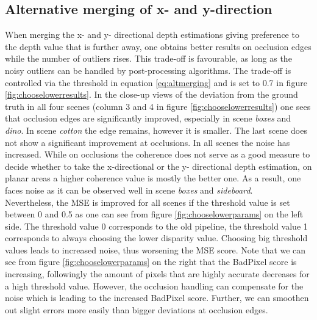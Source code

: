 \documentclass  [
  paper    = a4,
  BCOR     = 10mm,
  twoside,
  fontsize = 12pt,
  fleqn,
  toc      = bibnumbered,
  toc      = listofnumbered,
  numbers  = noendperiod,
  headings = normal,
  listof   = leveldown,
  version  = 3.03
]                                       {scrreprt}
\begin{document}
\subsection{Alternative merging of x- and y-direction}
\label{sec:ev_merging}
When merging the x- and y- directional depth estimations giving preference to the depth value that is further away, one obtains better results on occlusion edges while the number of outliers rises. This trade-off is favourable, as long as the noisy outliers can be handled by post-processing algorithms. The trade-off is controlled via the threshold in equation \ref{eq:altmerging} and is set to 0.7 in figure \ref{fig:chooselowerresults}. In the close-up views of the deviation from the ground truth in all four scenes (column 3 and 4 in figure \ref{fig:chooselowerresults}) one sees that occlusion edges are significantly improved, especially in scene \textit{boxes} and \textit{dino}. In scene \textit{cotton} the edge remains, however it is smaller. The last scene does not show a significant improvement at occlusions. In all scenes the noise has increased. While on occlusions the coherence does not serve as a good measure to decide whether to take the x-directional or the y- directional depth estimation, on planar areas a higher coherence value is mostly the better one. As a result, one faces noise as it can be observed well in scene \textit{boxes} and \textit{sideboard}. \\
Nevertheless, the MSE is improved for all scenes if the threshold value is set between 0 and 0.5 as one can see from figure \ref{fig:chooselowerparams} on the left side. The threshold value 0 corresponds to the old pipeline, the threshold value 1 corresponds to always choosing the lower disparity value. Choosing big threshold values leads to increased noise, thus worsening the MSE score. Note that we can see from figure \ref{fig:chooselowerparams} on the right that the BadPixel score is increasing, followingly the amount of pixels that are highly accurate decreases for a high threshold value. However, the occlusion handling can compensate for the noise which is leading to the increased BadPixel score. Further, we can smoothen out slight errors more easily than bigger deviations at occlusion edges.\\
\end{document}
